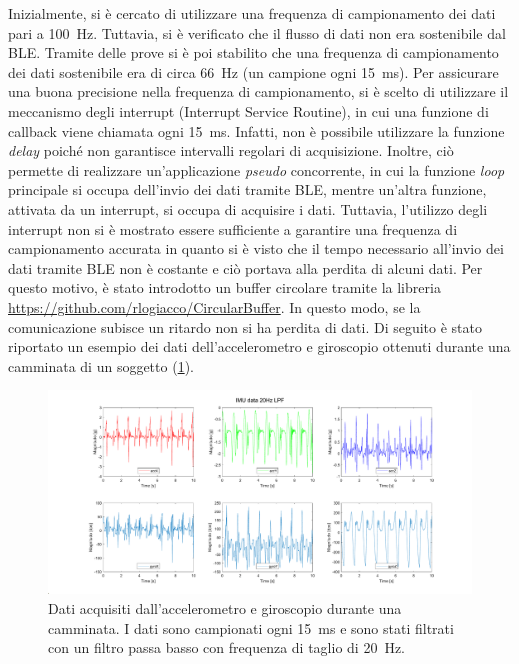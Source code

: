 Inizialmente, si è cercato di utilizzare una frequenza di campionamento dei dati pari a \SI{100}{\hertz}. Tuttavia, si è verificato che il flusso di dati non era sostenibile dal BLE. Tramite delle prove si è poi stabilito che una frequenza di campionamento dei dati sostenibile era di circa \SI{66}{\hertz} (un campione ogni \SI{15}{\milli\second}). Per assicurare una buona precisione nella frequenza di campionamento, si è scelto di utilizzare il meccanismo degli interrupt (Interrupt Service Routine), in cui una funzione di callback viene chiamata ogni \SI{15}{\milli\second}. Infatti, non è possibile utilizzare la funzione \textit{delay} poiché non garantisce intervalli regolari di acquisizione. Inoltre, ciò permette di realizzare un'applicazione \textit{pseudo} concorrente, in cui la funzione \textit{loop} principale si occupa dell'invio dei dati tramite BLE, mentre un'altra funzione, attivata da un interrupt, si occupa di acquisire i dati. Tuttavia, l'utilizzo degli interrupt non si è mostrato essere sufficiente a garantire una frequenza di campionamento accurata in quanto si è visto che il tempo necessario all'invio dei dati tramite BLE non è costante e ciò portava alla perdita di alcuni dati.
Per questo motivo, è stato introdotto un buffer circolare tramite la libreria \url{https://github.com/rlogiacco/CircularBuffer}. In questo modo, se la comunicazione subisce un ritardo non si ha perdita di dati. Di seguito è stato riportato un esempio dei dati dell'accelerometro e giroscopio ottenuti durante una camminata di un soggetto (\Fig\ref{fig:imu_data}).
\begin{figure}[tbh]
	\centering
	\includegraphics[width=1\linewidth]{./ImageFiles/IMU_data_example.pdf}
	\caption{Dati acquisiti dall'accelerometro e giroscopio durante una camminata. I dati sono campionati ogni \SI{15}{\milli\second} e sono stati filtrati con un filtro passa basso con frequenza di taglio di \SI{20}{\hertz}.}
	\label{fig:imu_data}
\end{figure}

